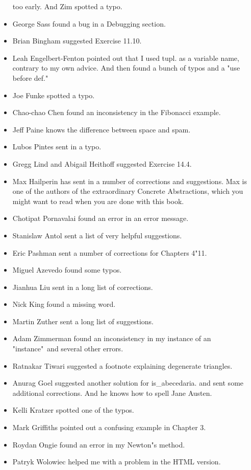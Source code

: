 \begin{itemize}
too early. And Zim spotted a typo. 
\item George Sass found a bug in a Debugging section. 
\item Brian Bingham suggested Exercise 11.10. 
\item Leah Engelbert-Fenton pointed out that I used tupl. 
as a variable name, contrary to my own 
advice. And then found a bunch of typos and a "use before def."
\item Joe Funke spotted a typo. 
\item Chao-chao Chen found an inconsistency in the Fibonacci example. 
\item Jeff Paine knows the difference between space and spam. 
\item Lubos Pintes sent in a typo. 
\item Gregg Lind and Abigail Heithoff suggested Exercise 14.4. 
\item Max Hailperin has sent in a number of corrections and suggestions. Max is one of the authors 
of the extraordinary Concrete Abstractions, which you might want to read when you are done 
with this book. 
\item Chotipat Pornavalai found an error in an error message. 
\item Stanislaw Antol sent a list of very helpful suggestions. 
\item Eric Pashman sent a number of corrections for Chapters 4"11. 
\item Miguel Azevedo found some typos. 
\item Jianhua Liu sent in a long list of corrections. 
\item Nick King found a missing word. 
\item Martin Zuther sent a long list of suggestions. 
\item Adam Zimmerman found an inconsistency in my instance of an "instance"\
and several other errors. 
\item Ratnakar Tiwari suggested a footnote explaining degenerate triangles. 
\item Anurag Goel suggested another solution for is\_abecedaria.
and sent some additional corrections. And he knows how to spell Jane Austen.
\item Kelli Kratzer spotted one of the typos. 
\item Mark Griffiths pointed out a confusing example in Chapter 3. 
\item Roydan Ongie found an error in my Newton"s method. 
\item Patryk Wolowiec helped me with a problem in the HTML version. 

\end{itemize}
